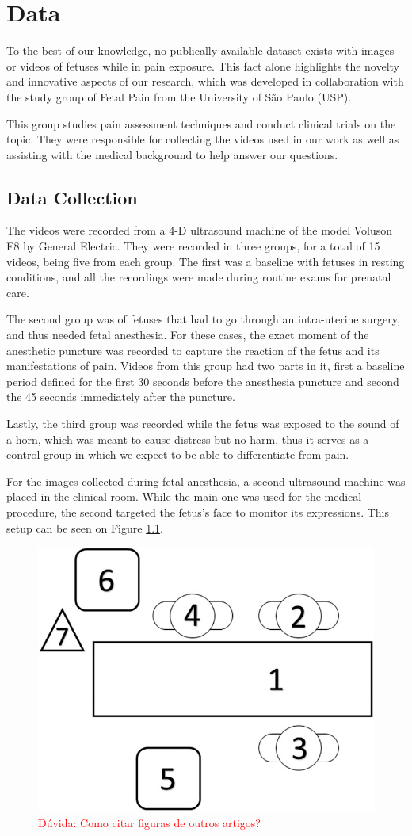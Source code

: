 \chapter{Data}

To the best of our knowledge, no publically available dataset exists with images or videos of fetuses while in pain exposure. This fact alone highlights the novelty and innovative aspects of our research, which was developed in collaboration with the study group of Fetal Pain from the University of São Paulo (USP). 

This group studies pain assessment techniques and conduct clinical trials on the topic. They were responsible for collecting the videos used in our work as well as assisting with the medical background to help answer our questions.

\section{Data Collection}

The videos were recorded from a 4-D ultrasound machine of the model Voluson E8 by General Electric. They were recorded in three groups, for a total of 15 videos, being five from each group. The first was a baseline with fetuses in resting conditions, and all the recordings were made during routine exams for prenatal care.

The second group was of fetuses that had to go through an intra-uterine surgery, and thus needed fetal anesthesia. For these cases, the exact moment of the anesthetic puncture was recorded to capture the reaction of the fetus and its manifestations of pain. Videos from this group had two parts in it, first a baseline period defined for the first 30 seconds before the anesthesia puncture and second the 45 seconds immediately after the puncture. 

Lastly, the third group was recorded while the fetus was exposed to the sound of a horn, which was meant to cause distress but no harm, thus it serves as a control group in which we expect to be able to differentiate from pain. 

For the images collected during fetal anesthesia, a second ultrasound machine was placed in the clinical room. While the main one was used for the medical procedure, the second targeted the fetus's face to monitor its expressions. This setup can be seen on Figure \ref{fig:ultrasound}.

\begin{figure}[h!tp]
    \centering
    \includegraphics[width=.35\textwidth]{imgs/chap03_ultrasound_setup.jpg}
    \caption{\textcolor{red}{Dúvida: Como citar figuras de outros artigos?}}
    \label{fig:ultrasound}
\end{figure}

